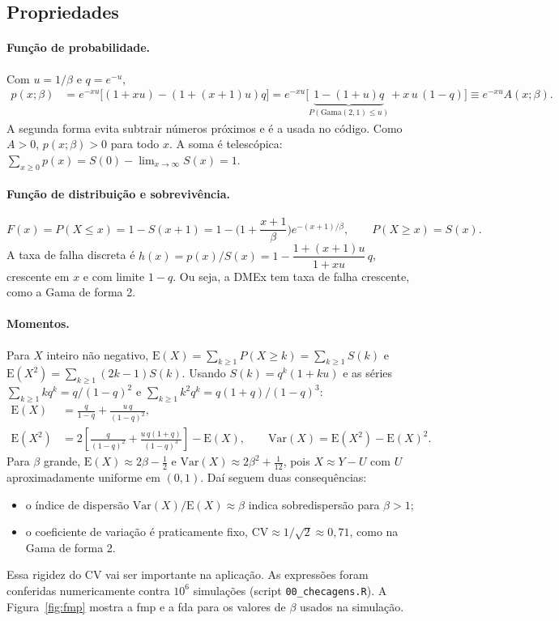 \documentclass[11pt,a4paper]{article}
\newcommand{\E}{\mathrm{E}}
\newcommand{\Var}{\mathrm{Var}}
\begin{document}
\subsection{Propriedades}

\paragraph{Função de probabilidade.} Com $u=1/\beta$ e $q=e^{-u}$,
\begin{align}
p(x;\beta)&=e^{-xu}\big[(1+xu)-(1+(x+1)u)q\big]
=e^{-xu}\Big[\underbrace{1-(1+u)q}_{P(\text{Gama}(2,1)\le u)}+x\,u\,(1-q)\Big]\equiv e^{-xu}A(x;\beta). \label{eq:fmp}
\end{align}
A segunda forma evita subtrair números próximos e é a usada no código. Como $A>0$, $p(x;\beta)>0$ para todo $x$. A soma é telescópica: $\sum_{x\ge0}p(x)=S(0)-\lim_{x\to\infty}S(x)=1$.

\paragraph{Função de distribuição e sobrevivência.}
\begin{equation}
F(x)=P(X\le x)=1-S(x+1)=1-\Big(1+\frac{x+1}{\beta}\Big)e^{-(x+1)/\beta},\qquad P(X\ge x)=S(x).
\end{equation}
A taxa de falha discreta é $h(x)=p(x)/S(x)=1-\dfrac{1+(x+1)u}{1+xu}\,q$, crescente em $x$ e com limite $1-q$. Ou seja, a DMEx tem taxa de falha crescente, como a Gama de forma 2.

\paragraph{Momentos.} Para $X$ inteiro não negativo, $\E(X)=\sum_{k\ge1}P(X\ge k)=\sum_{k\ge1}S(k)$ e $\E(X^2)=\sum_{k\ge1}(2k-1)S(k)$. Usando $S(k)=q^k(1+ku)$ e as séries $\sum_{k\ge1}kq^k=q/(1-q)^2$ e $\sum_{k\ge1}k^2q^k=q(1+q)/(1-q)^3$:
\begin{align}
\E(X)&=\frac{q}{1-q}+\frac{u\,q}{(1-q)^2},\\
\E(X^2)&=2\left[\frac{q}{(1-q)^2}+\frac{u\,q(1+q)}{(1-q)^3}\right]-\E(X),\qquad \Var(X)=\E(X^2)-\E(X)^2.
\end{align}
Para $\beta$ grande, $\E(X)\approx2\beta-\tfrac12$ e $\Var(X)\approx2\beta^2+\tfrac1{12}$, pois $X\approx Y-U$ com $U$ aproximadamente uniforme em $(0,1)$. Daí seguem duas consequências:
\begin{itemize}
\item o índice de dispersão $\Var(X)/\E(X)\approx\beta$ indica sobredispersão para $\beta>1$;
\item o coeficiente de variação é praticamente fixo, $\text{CV}\approx1/\sqrt2\approx0{,}71$, como na Gama de forma 2.
\end{itemize}
Essa rigidez do CV vai ser importante na aplicação. As expressões foram conferidas numericamente contra $10^6$ simulações (script \texttt{00\_checagens.R}). A Figura~\ref{fig:fmp} mostra a fmp e a fda para os valores de $\beta$ usados na simulação.
\end{document}
